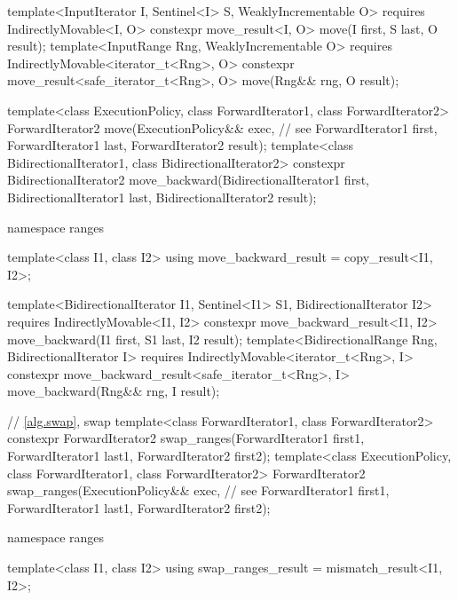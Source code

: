 \begin{addedblock}
\begin{codeblock}
{    template<InputIterator I, Sentinel<I> S, WeaklyIncrementable O>
      requires IndirectlyMovable<I, O>
      constexpr move_result<I, O>
        move(I first, S last, O result);
    template<InputRange Rng, WeaklyIncrementable O>
      requires IndirectlyMovable<iterator_t<Rng>, O>
      constexpr move_result<safe_iterator_t<Rng>, O>
        move(Rng&& rng, O result);
  }
\end{codeblock}\end{addedblock}\begin{codeblock}
  template<class ExecutionPolicy, class ForwardIterator1,
           class ForwardIterator2>
    ForwardIterator2 move(ExecutionPolicy&& exec, // see 
                          ForwardIterator1 first, ForwardIterator1 last,
                          ForwardIterator2 result);
  template<class BidirectionalIterator1, class BidirectionalIterator2>
    constexpr BidirectionalIterator2
      move_backward(BidirectionalIterator1 first, BidirectionalIterator1 last,
                    BidirectionalIterator2 result);
\end{codeblock}\begin{addedblock}\begin{codeblock}
  namespace ranges {
    template<class I1, class I2>
    using move_backward_result = copy_result<I1, I2>;

    template<BidirectionalIterator I1, Sentinel<I1> S1, BidirectionalIterator I2>
      requires IndirectlyMovable<I1, I2>
      constexpr move_backward_result<I1, I2>
        move_backward(I1 first, S1 last, I2 result);
    template<BidirectionalRange Rng, BidirectionalIterator I>
      requires IndirectlyMovable<iterator_t<Rng>, I>
      constexpr move_backward_result<safe_iterator_t<Rng>, I>
        move_backward(Rng&& rng, I result);
  }
\end{codeblock}\end{addedblock}\begin{codeblock}

  // \ref{alg.swap}, swap
  template<class ForwardIterator1, class ForwardIterator2>
    constexpr ForwardIterator2
      swap_ranges(ForwardIterator1 first1, ForwardIterator1 last1,
                  ForwardIterator2 first2);
  template<class ExecutionPolicy, class ForwardIterator1, class ForwardIterator2>
    ForwardIterator2
      swap_ranges(ExecutionPolicy&& exec, // see 
                  ForwardIterator1 first1, ForwardIterator1 last1,
                  ForwardIterator2 first2);
\end{codeblock}\begin{addedblock}\begin{codeblock}
  namespace ranges {
    template<class I1, class I2>
    using swap_ranges_result = mismatch_result<I1, I2>;

}
\end{codeblock}
\end{addedblock}
